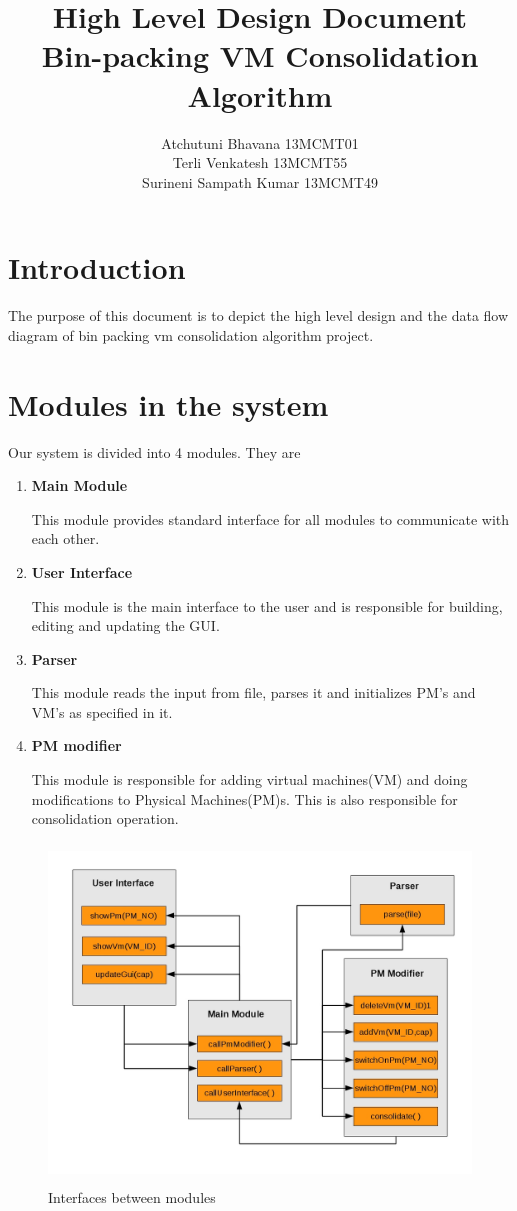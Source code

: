 \documentclass[a4paper,11pt]{article}
\title{High Level Design Document \\ Bin-packing VM Consolidation Algorithm}
\author{Atchutuni Bhavana 13MCMT01  \\ Terli Venkatesh 13MCMT55 \\ Surineni Sampath Kumar 13MCMT49}
\date{}
\begin{document}
\maketitle
\pagebreak
\tableofcontents
\pagebreak

\section{Introduction}
The purpose of this document is to depict the high level
design and the data flow diagram of bin packing
vm consolidation algorithm project.
\section{Modules in the system}
Our system is divided into 4 modules. They are
\begin{enumerate}
\item \textbf{ Main Module }

This module provides standard interface for all modules to communicate with each other.
\item \textbf{ User Interface }

This module is the main interface to the user and is responsible for building, editing and updating the GUI.
\item \textbf{ Parser }

This module reads the input from file, parses it and initializes PM’s and VM’s as specified in it.
\item \textbf{ PM modifier }

This module is responsible for adding virtual machines(VM) and doing modifications to Physical Machines(PM)s. This is also responsible for consolidation operation.

\end{enumerate}

\begin{figure}[h]
\centering
\includegraphics[height=9cm]{images/intrfc.jpg} 
\caption{Interfaces between modules}
\label{fig:interfaces}

\end{figure}
\end{document}
